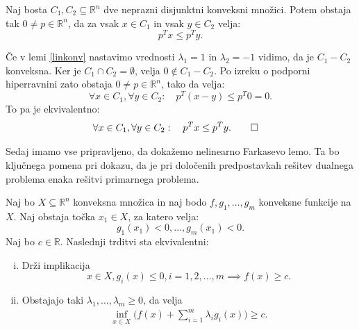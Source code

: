 \documentclass[mat1]{fmfdelo}
\newcommand{\R}{\mathbb R}
\begin{document}
\begin{izrek}
	Naj bosta $C_1, C_2\subseteq \R^n$ dve neprazni disjunktni konveksni množici. Potem obstaja tak $0 \ne p \in \R^n$, da za vsak $x \in C_1$ in vsak $y \in C_2$ velja: 
	$$ p^Tx\le p^Ty.$$
\end{izrek}


\begin{dokaz}
	Če v lemi \ref{linkonv} nastavimo vrednosti $\lambda_1 = 1$ in $\lambda_2 = -1$ vidimo, da je $C_1 - C_2$  konveksna. Ker je $C_1 \cap C_2 = \emptyset$, velja $0 \notin C_1 - C_2$. Po izreku o podporni hiperravnini zato obstaja $0 \ne p \in \R^n$, tako da velja:
	$$\forall x \in C_1, \forall y \in C_2: \quad p^T(x-y) \le p^T0 = 0.  $$
	To pa je ekvivalentno: 
	\begin{align*}
			\forall x \in C_1, \forall y \in C_2: \quad  p^Tx\le p^Ty. &\qedhere
	\end{align*} 
\end{dokaz}

Sedaj imamo vse pripravljeno, da dokažemo nelinearno Farkasevo lemo. Ta bo ključnega pomena pri dokazu, da je pri določenih predpostavkah rešitev dualnega problema enaka rešitvi primarnega problema. 

\begin{izrek}
	Naj bo $X \subseteq \R^n$ konveksna množica in naj bodo $f, g_1, \ldots, g_m$ konveksne funkcije na $X$. Naj obstaja točka $x_1 \in X$, za katero velja: 
	$$ g_1(x_1) < 0, \ldots, g_m(x_1) < 0. $$ 
	Naj bo $c \in \R$. Naslednji trditvi sta ekvivalentni: 
	\begin{enumerate}[(i)]
		\item 
		Drži implikacija
		$$x\in X, g_i(x) \le 0, i = 1,2, \ldots, m \implies   f(x) \ge c .$$
		\item 
		Obstajajo taki $\lambda_1, \ldots, \lambda_m \ge 0$, da velja
		\begin{align}
		\label{F2} \inf_{x \in X} \Big(f(x) + \sum_{i=1}^{m}\lambda_ig_i(x)\Big) \ge c.
		\end{align}
		
	\end{enumerate}
\end{izrek}
\end{document}
